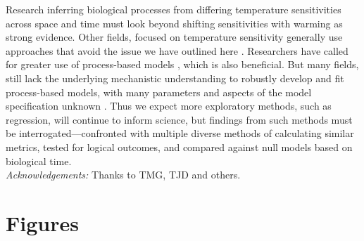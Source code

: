\documentclass[11pt,letter]{article}
\begin{document}
Research inferring biological processes from differing temperature sensitivities across space and time must look beyond shifting sensitivities with warming as strong evidence. Other fields, focused on temperature sensitivity generally use approaches that avoid the issue we have outlined here \citep[e.g.,][]{yuste2004}. Researchers have called for greater use of process-based models \citep{keenan2019}, which is also beneficial. But many fields, still lack the underlying mechanistic understanding to robustly develop and fit process-based models, with many parameters and aspects of the model specification unknown \citep{chuine2016}. Thus we expect more exploratory methods, such as regression, will continue to inform science, but findings from such methods must be interrogated---confronted with multiple diverse methods of calculating similar metrics, tested for logical outcomes, and compared against null models based on biological time. \\ %

\emph{Acknowledgements:} Thanks to TMG, TJD and others. 





\newpage
\section* {Figures}
\end{document}
